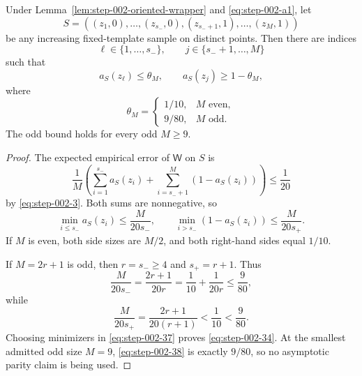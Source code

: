 \begin{lemma}
\label{lem:step-002-side-marginals}

Under Lemma~\ref{lem:step-002-oriented-wrapper} and \eqref{eq:step-002-a1}, let
\[
S=((z_1,0),\ldots,(z_{s_-},0),
(z_{s_-+1},1),\ldots,(z_M,1))
\tag{32}\label{eq:step-002-32}
\]
be any increasing fixed-template sample on distinct points. Then there are indices
\[
\ell\in\{1,\ldots,s_-\},
\qquad
j\in\{s_-+1,\ldots,M\}
\tag{33}\label{eq:step-002-33}
\]
such that
\[
a_S(z_\ell)\le\theta_M,
\qquad
a_S(z_j)\ge1-\theta_M,
\tag{34}\label{eq:step-002-34}
\]
where
\[
\theta_M=
\begin{cases}
1/10,&M\text{ even},\\
9/80,&M\text{ odd}.
\end{cases}
\tag{35}\label{eq:step-002-35}
\]
The odd bound holds for every odd \(M\ge 9\).

\end{lemma}

\begin{proof}

The expected empirical error of \(\mathsf W\) on \(S\) is
\[
\frac1M\left(
\sum_{i=1}^{s_-}a_S(z_i)
+\sum_{i=s_-+1}^{M}(1-a_S(z_i))
\right)\le\frac1{20}
\tag{36}\label{eq:step-002-36}
\]
by \eqref{eq:step-002-3}. Both sums are nonnegative, so
\[
\min_{i\le s_-}a_S(z_i)
\le\frac{M}{20s_-},
\qquad
\min_{i>s_-}(1-a_S(z_i))
\le\frac{M}{20s_+}.
\tag{37}\label{eq:step-002-37}
\]
If \(M\) is even, both side sizes are \(M/2\), and both right-hand sides equal \(1/10\).

If \(M=2r+1\) is odd, then \(r=s_-\ge 4\) and \(s_+=r+1\). Thus
\[
\frac{M}{20s_-}
=\frac{2r+1}{20r}
=\frac1{10}+\frac1{20r}
\le\frac9{80},
\tag{38}\label{eq:step-002-38}
\]
while
\[
\frac{M}{20s_+}
=\frac{2r+1}{20(r+1)}
<\frac1{10}<\frac9{80}.
\tag{39}\label{eq:step-002-39}
\]
Choosing minimizers in \eqref{eq:step-002-37} proves \eqref{eq:step-002-34}. At the smallest admitted odd size \(M=9\), \eqref{eq:step-002-38} is exactly \(9/80\), so no asymptotic parity claim is being used.

\end{proof}


